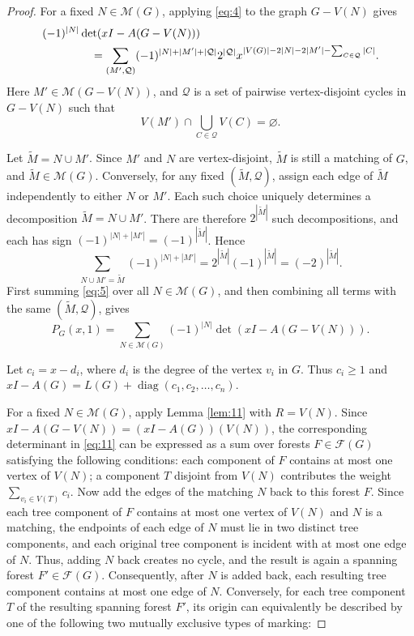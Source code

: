 \documentclass[11pt, a4paper]{article}
\theoremstyle{plain}
\begin{document}
\begin{proof}
For a fixed $N\in\mathcal{M}(G)$,
applying \eqref{eq:4} to the graph $G-V(N)$ gives
\begin{align}
(-1)^{|N|}
&\det(xI-A(G-V(N))) \notag\\
&\quad
=\sum_{(M',\mathcal{Q})}
(-1)^{|N|+|M'|+|\mathcal{Q}|}2^{|\mathcal{Q}|}
x^{|V(G)|-2|N|-2|M'|-\sum_{C\in\mathcal{Q}}|C|}.
\label{eq:5}
\end{align}
Here $M'\in\mathcal{M}(G-V(N))$,
and $\mathcal{Q}$ is a set of pairwise vertex-disjoint cycles in $G-V(N)$ such that
\[
V(M')\cap\bigcup_{C\in\mathcal{Q}}V(C)=\varnothing.
\]

Let $\widetilde{M}=N \cup M'$.
Since $M'$ and $N$ are vertex-disjoint,
$\widetilde{M}$ is still a matching of $G$,
and $\widetilde{M}\in\mathcal{M}(G)$.
Conversely, for any fixed $(\widetilde{M},\mathcal{Q})$,
assign each edge of $\widetilde{M}$ independently to either $N$ or $M'$.
Each such choice uniquely determines a decomposition $\widetilde{M}=N \cup M'$.
There are therefore $2^{|\widetilde{M}|}$ such decompositions, and each has sign
$(-1)^{|N|+|M'|}=(-1)^{|\widetilde{M}|}$. Hence
\[
\sum_{N \cup M'=\widetilde{M}}
(-1)^{|N|+|M'|}
=2^{|\widetilde{M}|}(-1)^{|\widetilde{M}|}
=(-2)^{|\widetilde{M}|}.
\]
First summing \eqref{eq:5} over all $N\in\mathcal{M}(G)$,
and then combining all terms with the same $(\widetilde{M},\mathcal{Q})$,
gives
\begin{equation}\label{eq:11}
P_G(x,1)
=
\sum_{N\in\mathcal{M}(G)}
(-1)^{|N|}
\det(xI-A(G-V(N))).
\end{equation}

Let $c_i=x-d_i$, where $d_i$ is the degree of the vertex $v_i$ in $G$.
Thus $c_i \geq 1$ and $xI-A(G)=L(G)+\operatorname{diag}(c_1, c_2, \dots, c_n)$.

For a fixed $N\in\mathcal{M}(G)$, apply Lemma \ref{lem:11} with $R=V(N)$.
Since $xI-A(G-V(N))=(xI-A(G))(V(N))$,
the corresponding determinant in \eqref{eq:11} can be expressed as
a sum over forests $F\in\mathcal{F}(G)$ satisfying the following conditions:
each component of $F$ contains at most one vertex of $V(N)$;
a component $T$ disjoint from $V(N)$ contributes the weight $\sum_{v_i\in V(T)}c_i$.
Now add the edges of the matching $N$ back to this forest $F$.
Since each tree component of $F$ contains at most one vertex of $V(N)$ and $N$ is a matching,
the endpoints of each edge of $N$ must lie in two distinct tree components,
and each original tree component is incident with at most one edge of $N$. Thus, adding $N$ back creates no cycle,
and the result is again a spanning forest $F' \in\mathcal{F}(G)$.
Consequently, after $N$ is added back, each resulting tree component contains at most one edge of $N$.
Conversely, for each tree component $T$ of the resulting spanning forest $F'$,
its origin can equivalently be described by one of the following two mutually exclusive types of marking:


\end{proof}
\end{document}

